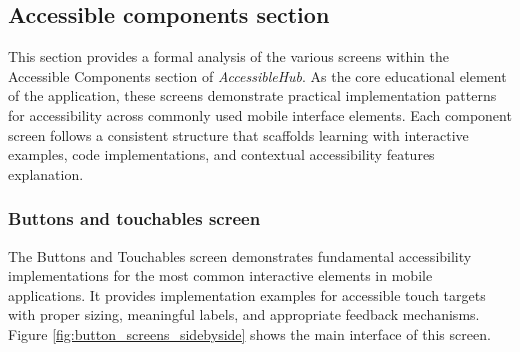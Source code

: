\subsection{Accessible components section}

This section provides a formal analysis of the various screens within the Accessible Components section of \textit{AccessibleHub}. As the core educational element of the application, these screens demonstrate practical implementation patterns for accessibility across commonly used mobile interface elements. Each component screen follows a consistent structure that scaffolds learning with interactive examples, code implementations, and contextual accessibility features explanation.

\subsubsection{Buttons and touchables screen}
\label{subsubsec:buttons-touchables}

The Buttons and Touchables screen demonstrates fundamental accessibility implementations for the most common interactive elements in mobile applications. It provides implementation examples for accessible touch targets with proper sizing, meaningful labels, and appropriate feedback mechanisms. Figure \ref{fig:button_screens_sidebyside} shows the main interface of this screen.


